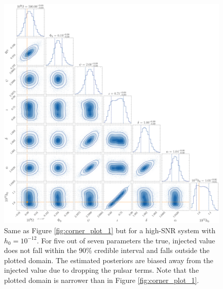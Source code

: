 \documentclass[fleqn,usenatbib,useAMS]{mnras}
\begin{document}
\begin{figure}
	\includegraphics[width=\textwidth, height =\textwidth]{images/large_h_example}
	\caption{Same as Figure \ref{fig:corner_plot_1} but for a high-SNR system with $h_0 = 10^{-12}$. For five out of seven parameters the true, injected value does not fall within the 90\% credible interval and falls outside the plotted domain. The estimated posteriors are biased away from the injected value due to dropping the pulsar terms. Note that the plotted domain is narrower than in Figure \ref{fig:corner_plot_1}.} 
	\label{fig:bias_for_large_h}
\end{figure}
\end{document}

